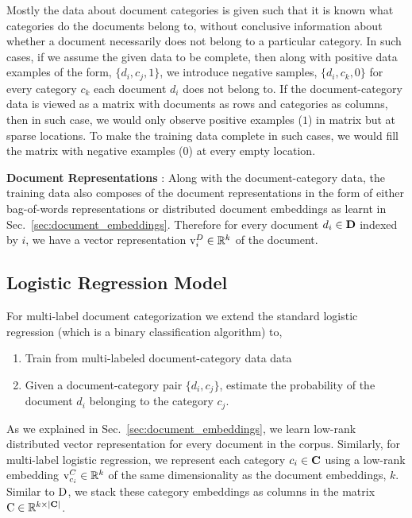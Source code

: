 Mostly the data about document categories is given such that it is known what categories do the documents belong to, without conclusive information about whether a document necessarily does not belong to a particular category. In such cases, if we assume the given data to be complete, then along with positive data examples of the form, $\{ d_{i}, c_{j}, 1\}$, we introduce negative samples, $\{ d_{i}, c_{k}, 0\}$ for every category $c_{k}$ each document $d_{i}$ does not belong to. 
If the document-category data is viewed as a matrix with documents as rows and categories as columns, then in such case, we would only observe positive examples ($1$) in matrix but at sparse locations. To make the training data complete in such cases, we would fill the matrix with negative examples ($0$) at every empty location.

\textbf{Document Representations} : 
Along with the document-category data, the training data also composes of the document representations in the form of either bag-of-words representations or distributed document embeddings as learnt in Sec.~\ref{sec:document_embeddings}.  Therefore for every document $d_{i} \in \mathbf{D}$ indexed by $i$, we have a vector representation $\mathrm{v}^{D}_{i} \in \mathbb{R}^{k}$ of the document.

\subsection{Logistic Regression Model}
For multi-label document categorization we extend the standard logistic regression (which is a binary classification algorithm) to,
\begin{enumerate}
\item Train from multi-labeled document-category data data 
\item Given a document-category pair $\{d_{i}, c_{j}\}$, estimate the probability of the document $d_{i}$ belonging to the category $c_{j}$.
\end{enumerate}
As we explained in Sec.~\ref{sec:document_embeddings}, we learn low-rank distributed vector representation for every document in the corpus. Similarly, for multi-label logistic regression, we represent each category $c_{i} \in \mathbf{C}$ using a low-rank embedding $\mathrm{v}^{C}_{c_{i}} \in \mathbb{R}^{k}$ of the same dimensionality as the document embeddings, $k$. Similar to $\mathrm{D}$, we stack these category embeddings as columns in the matrix $\mathrm{C} \in \mathbb{R}^{k \times |\mathbf{C}|}$.

